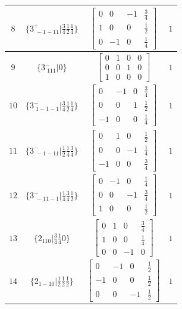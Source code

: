\documentclass[fleqn,8pt]{jsarticle}
\begin{document}
\begin{longtable}{cccc}
$ 8 $ & $ \{3^{+}_{\,\,-1-11}|\frac{3}{4} \frac{1}{2} \frac{1}{4}\} $ & $ \begin{bmatrix} 0 & 0 & -1 & \frac{3}{4} \\ 1 & 0 & 0 & \frac{1}{2} \\ 0 & -1 & 0 & \frac{1}{4} \end{bmatrix} $ & $ 1 $ \\ \hline
$ 9 $ & $ \{3^{-}_{\,\,111}|0\} $ & $ \begin{bmatrix} 0 & 1 & 0 & 0 \\ 0 & 0 & 1 & 0 \\ 1 & 0 & 0 & 0 \end{bmatrix} $ & $ 1 $ \\ \hline
$ 10 $ & $ \{3^{-}_{\,\,1-1-1}|\frac{3}{4} \frac{1}{2} \frac{1}{4}\} $ & $ \begin{bmatrix} 0 & -1 & 0 & \frac{3}{4} \\ 0 & 0 & 1 & \frac{1}{2} \\ -1 & 0 & 0 & \frac{1}{4} \end{bmatrix} $ & $ 1 $ \\ \hline
$ 11 $ & $ \{3^{-}_{\,\,-1-11}|\frac{1}{2} \frac{1}{4} \frac{3}{4}\} $ & $ \begin{bmatrix} 0 & 1 & 0 & \frac{1}{2} \\ 0 & 0 & -1 & \frac{1}{4} \\ -1 & 0 & 0 & \frac{3}{4} \end{bmatrix} $ & $ 1 $ \\ \hline
$ 12 $ & $ \{3^{-}_{\,\,-11-1}|\frac{1}{4} \frac{3}{4} \frac{1}{2}\} $ & $ \begin{bmatrix} 0 & -1 & 0 & \frac{1}{4} \\ 0 & 0 & -1 & \frac{3}{4} \\ 1 & 0 & 0 & \frac{1}{2} \end{bmatrix} $ & $ 1 $ \\ \hline
$ 13 $ & $ \{2{}_{110}|\frac{3}{4} \frac{1}{4} 0\} $ & $ \begin{bmatrix} 0 & 1 & 0 & \frac{3}{4} \\ 1 & 0 & 0 & \frac{1}{4} \\ 0 & 0 & -1 & 0 \end{bmatrix} $ & $ 1 $ \\ \hline
$ 14 $ & $ \{2{}_{1-10}|\frac{1}{2} \frac{1}{2} \frac{1}{2}\} $ & $ \begin{bmatrix} 0 & -1 & 0 & \frac{1}{2} \\ -1 & 0 & 0 & \frac{1}{2} \\ 0 & 0 & -1 & \frac{1}{2} \end{bmatrix} $ & $ 1 $ \\ \hline

\end{longtable}
\end{document}

